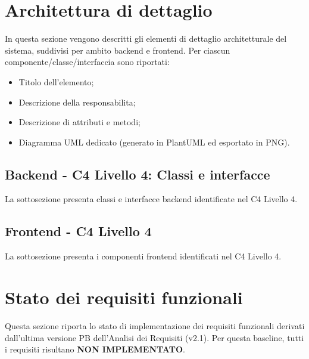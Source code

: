 \documentclass[a4paper, 11pt, oneside]{scrartcl}
\begin{document}
\section{Architettura di dettaglio}

In questa sezione vengono descritti gli elementi di dettaglio architetturale del sistema, suddivisi per ambito backend e frontend.
Per ciascun componente/classe/interfaccia sono riportati:
\begin{itemize}
    \item Titolo dell'elemento;
    \item Descrizione della responsabilita;
    \item Descrizione di attributi e metodi;
    \item Diagramma UML dedicato (generato in PlantUML ed esportato in PNG).
\end{itemize}

\subsection{Backend - C4 Livello 4: Classi e interfacce}
La sottosezione presenta classi e interfacce backend identificate nel C4 Livello 4.







\subsection{Frontend - C4 Livello 4}
La sottosezione presenta i componenti frontend identificati nel C4 Livello 4.







\newpage
\section{Stato dei requisiti funzionali}

Questa sezione riporta lo stato di implementazione dei requisiti funzionali derivati dall'ultima versione PB dell'Analisi dei Requisiti (v2.1). Per questa baseline, tutti i requisiti risultano \textbf{NON IMPLEMENTATO}.
\end{document}
